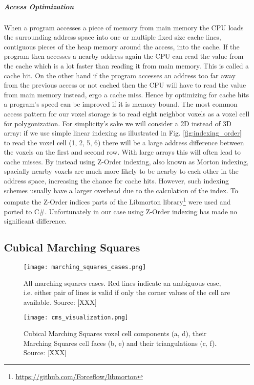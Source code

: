 \subparagraph{Access Optimization}

When a program accesses a piece of memory from main memory the CPU loads the surrounding address space into one or multiple fixed size cache lines, contiguous pieces of the heap memory around the access, into the cache.
If the program then accesses a nearby address again the CPU can read the value from the cache which is a lot faster than reading it from main memory. This is called a cache hit. On the other hand if the program accesses an address too far away from the previous access or not cached then the CPU will have to read the value from main memory instead, ergo a cache miss. Hence by optimizing for cache hits a program's speed can be improved if it is memory bound. The most
common access pattern for our voxel storage is to read eight neighbor voxels as a voxel cell for polygonization.
For simplicity's sake we will consider a 2D instead of 3D array: if we use simple linear indexing as illustrated in Fig. \ref{fig:indexing_order} to read the voxel cell (1, 2, 5, 6) there will be a large address difference between the voxels
on the first and second row. With large arrays this will often lead to cache misses. By instead using Z-Order indexing, also known as Morton indexing, spacially nearby voxels are much more likely to be nearby to each other in the address space, increasing the chance for cache hits. However, such indexing schemes usually have a larger overhead due to the calculation of the index. To compute the Z-Order indices parts of the Libmorton library\footnote{\url{https://github.com/Forceflow/libmorton}} were used and ported to C\#. Unfortunately in our case using Z-Order indexing has made no significant difference.


\subsection{Cubical Marching Squares}
\label{sec:cms}

\hfill

\begin{figure}[!htb]
\vspace*{10mm}
\texttt{[image: marching\_squares\_cases.png]}
\vspace*{10mm}
\caption{All marching squares cases. Red lines indicate an ambiguous case,
i.e. either pair of lines is valid if only the corner values of the cell
are available. Source: [XXX]\protect\footnotemark}
\label{fig:marching_squares_cases}
\endminipage\hfill
{}
\texttt{[image: cms\_visualization.png]}
\caption{Cubical Marching Squares voxel cell components (a, d), their Marching Squares cell faces (b, e) and their triangulations (c, f). Source: [XXX]}
\label{fig:cms_visualization}
\endminipage\hfill
\end{figure}

